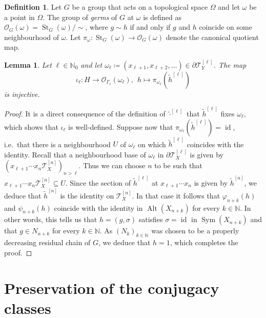 \documentclass[a4paper]{amsart}
\numberwithin{equation}{section}
\newtheorem{lemma}[theorem]{Lemma}
\theoremstyle{definition}
\newtheorem{definition}[theorem]{Definition}
\theoremstyle{remark}
\newcommand{\N}{\mathbb{N}}
\DeclareMathOperator{\Alt}{Alt}
\DeclareMathOperator{\id}{id}
\DeclareMathOperator{\St}{St}
\DeclareMathOperator{\Sym}{Sym}
\newcommand{\T}{\mathcal{T}}
\newcommand{\defeq}\coloneqq%
\begin{document}
\begin{definition}\label{def:germ}
Let $G$ be a group that acts on a topological space $\Omega$ and let $\omega$ be a point in $\Omega$.
The group of \emph{germs} of $G$ at $\omega$ is defined as $\mathcal{O}_{G}(\omega) = \St_{G}(\omega) / \sim$, where $g \sim h$ if and only if $g$ and $h$ coincide on some neighbourhood of $\omega$.
Let $\pi_{\omega} \colon \St_{G}(\omega) \rightarrow \mathcal{O}_G(\omega)$ denote the canonical quotient map.
\end{definition}

\begin{lemma}\label{lem:embedding-into-germ}
Let $\ell \in \N_0$ and let $\omega_{\ell} \defeq (x_{\ell+1},x_{\ell+2},\ldots) \in \partial \T_Y^{[\ell]}$.
The map
\[
\iota_{\ell} \colon H \rightarrow \mathcal{O}_{\Gamma_{\ell}}(\omega_{\ell}),
\ \ h \mapsto \pi_{\omega_{\ell}}(\widetilde{h}^{[\ell]})
\]
is injective.
\end{lemma}
\begin{proof}
It is a direct consequence of the definition of $\widetilde{\cdot}^{[\ell]}$ that $\widetilde{h}^{[\ell]}$ fixes $\omega_{\ell}$, which shows that $\iota_{\ell}$ is well-defined.
Suppose now that $\pi_{\omega_{\ell}}(\widetilde{h}^{[\ell]}) = \id$, i.e.\ that there is a neighbourhood $U$ of $\omega_{\ell}$ on which $\widetilde{h}^{[\ell]}$ coincides with the identity.
Recall that a neighbourhood base of $\omega_{\ell}$ in $\partial \T_X^{[\ell]}$ is given by $(x_{\ell+1} \cdots x_{n} \T_X^{[n]})_{n > \ell}$.
Thus we can choose $n$ to be such that $x_{\ell+1} \cdots x_{n} \T_X^{[n]} \subseteq U$.
Since the section of $\widetilde{h}^{[\ell]}$ at $x_{\ell+1} \cdots x_{n}$ is given by $\widetilde{h}^{[n]}$, we deduce that $\widetilde{h}^{[n]}$ is the identity on $\T_X^{[n]}$.
In that case it follows that $\varphi_{n+k}(h)$ and $\psi_{n+k}(h)$ coincide with the identity in $\Alt(X_{n+k})$ for every $k \in \N$.
In other words, this tells us that $h = (g,\sigma)$ satisfies $\sigma = \id$ in $\Sym(X_{n+k})$ and that $g \in N_{n+k}$ for every $k \in \N$.
As $(N_k)_{k \in \N}$ was chosen to be a properly decreasing residual chain of $G$, we deduce that $h = 1$, which completes the proof.
\end{proof}

\section{Preservation of the conjugacy classes}
\end{document}

